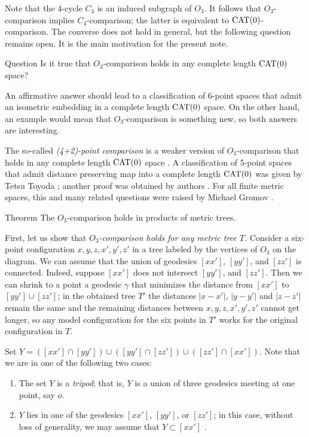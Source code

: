 \documentclass{article}
\begin{document}
Note that the 4-cycle $C_4$ is an induced subgraph of $O_3$.
It follows that $O_3$-comparison implies $C_4$-comparison;
the latter is equivalent to $\mathrm{CAT}(0)$-comparison.
The converse does not hold in general, but the following question remains open.
It is the main motivation for the present note.

\begin{thm}{Question}
Is it true that $O_3$-comparison holds in any complete length $\mathrm{CAT}(0)$ space?
\end{thm}

An affirmative answer should lead to a classification of 6-point spaces that admit an isometric embedding in a complete length $\mathrm{CAT}(0)$ space.
On the other hand, an example would mean that $O_3$-comparison is something new,
so both answers are interesting.

The so-called \emph{(4+2)-point comparison} is a weaker version of $O_3$-comparison that holds in any complete length $\mathrm{CAT}(0)$ space \cite{AKP-Kirszbraun,alexander2019alexandrov}.
A classification of 5-point spaces that admit distance preserving map into a complete length $\mathrm{CAT}(0)$ was given by Tetsu Toyoda \cite{toyoda};
another proof was obtained by authors \cite{lebedeva-petrunin}.
For all finite metric spaces, this and many related questions were raised by Michael Gromov \cite[1.19$_+(e)$]{gromov}.

\begin{thm}{Theorem}
The $O_3$-comparison holds in products of metric trees.
\end{thm}

First, let us show that \textit{$O_3$-comparison holds for any metric tree $T$.}
Consider a six-point configuration $x,y,z,x',y',z'$ in a tree labeled by the vertices of $O_3$ on the diagram.
We can assume that the union of geodesics $[xx']$, $[yy']$, and $[zz']$ is connected.
Indeed, suppose $[xx']$ does not intersect $[yy']$, and $[zz']$.
Then we can shrink to a point a geodesic $\gamma$ that minimizes the distance from $[xx']$ to $[yy']\cup[zz']$;
in the obtained tree $T'$ the distances $|x-x'|$, $|y-y'|$ and $|z-z'|$ remain the same and the remaining distances between $x,y,z,x',y',z'$ cannot get longer, so any model configuration for the six points in $T'$ works for the original configuration in $T$.

Set $Y=([xx']\cap [yy'])\cup([yy']\cap [zz'])\cup([zz']\cap [xx'])$.
Note that we are in one of the following two cases:
\begin{enumerate}
\item The set $Y$ is a \emph{tripod}; that is, $Y$ is a union of three geodesics meeting at one point, say $o$.
\item $Y$ lies in one of the  geodesics $[xx']$, $[yy']$, or $[zz']$;
in this case, without loss of generality, we may assume that $Y\subset [xx']$ .
\end{enumerate}
\end{document}
